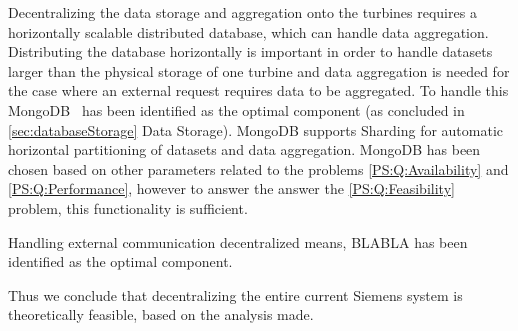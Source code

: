 Decentralizing the data storage and aggregation onto the turbines requires a horizontally scalable distributed database, which can handle data aggregation. Distributing the database horizontally is important in order to handle datasets larger than the physical storage of one turbine and data aggregation is needed for the case where an external request requires data to be aggregated. To handle this MongoDB~\cite{mongodb} has been identified as the optimal component (as concluded in \cref{sec:databaseStorage} Data Storage). MongoDB supports Sharding for automatic horizontal partitioning of datasets and data aggregation. MongoDB has been chosen based on other parameters related to the problems \cref{PS:Q:Availability} and \cref{PS:Q:Performance}, however to answer the answer the \cref{PS:Q:Feasibility} problem, this functionality is sufficient. 

Handling external communication decentralized means, BLABLA has been identified as the optimal component.

Thus we conclude that decentralizing the entire current Siemens system is theoretically feasible, based on the analysis made. 
\clearpage